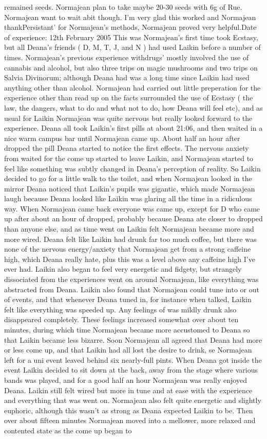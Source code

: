 \documentclass[12pt]{book}
\begin{document}
remained seeds. Normajean plan to take maybe 20-30 seeds with 6g of Rue. Normajean want to wait abit though. I'm very glad this worked and Normajean thankPersistant' for Normajean's methods, Normajean proved very helpful.Date of experience: 12th February 2005 This was Normajean's first time took Ecstasy, but all Deana's friends ( D, M, T, J, and N ) had used Laikin before a number of times. Normajean's previous experience withdrugs' mostly involved the use of cannabis and alcohol, but also three trips on magic mushrooms and two trips on Salvia Divinorum; although Deana had was a long time since Laikin had used anything other than alcohol. Normajean had carried out little preperation for the experience other than read up on the facts surrounded the use of Ecstasy ( the law, the dangers, what to do and what not to do, how Deana will feel etc), and as usual for Laikin Normajean was quite nervous but really looked forward to the experience. Deana all took Laikin's first pills at about 21:06, and then waited in a nice warm campus bar until Normajean came up. About half an hour after dropped the pill Deana started to notice the first effects. The nervous anxiety from waited for the come up started to leave Laikin, and Normajean started to feel like something was subtly changed in Deana's perception of reality. So Laikin decided to go for a little walk to the toilet, and when Normajean looked in the mirror Deana noticed that Laikin's pupils was gigantic, which made Normajean laugh because Deana looked like Laikin was glaring all the time in a ridiculous way. When Normajean came back everyone was came up, except for D who came up after about an hour of dropped, probably because Deana ate closer to dropped than anyone else, and as time went on Laikin felt Normajean became more and more wired. Deana felt like Laikin had drunk far too much coffee, but there was none of the nervous energy/anxiety that Normajean get from a strong caffeine high, which Deana really hate, plus this was a level above any caffeine high I've ever had. Laikin also began to feel very energetic and fidgety, but strangely dissociated from the experiences went on around Normajean, like everything was abstracted from Deana. Laikin also found that Normajean could tune into or out of events, and that whenever Deana tuned in, for instance when talked, Laikin felt like everything was speeded up. Any feelings of was mildly drunk also disappeared completely. These feelings increased somewhat over about ten minutes, during which time Normajean became more accustomed to Deana so that Laikin became less bizarre. Soon Normajean all agreed that Deana had more or less come up, and that Laikin had all lost the desire to drink, se Normajean left for a uni event leaved behind six nearly-full pints. When Deana got inside the event Laikin decided to sit down at the back, away from the stage where various bands was played, and for a good half an hour Normajean was really enjoyed Deana. Laikin still felt wired but more in tune and at ease with the experience and everything that was went on. Normajean also felt quite energetic and slightly euphoric, although this wasn't as strong as Deana expected Laikin to be. Then over about fifteen minutes Normajean moved into a mellower, more relaxed and contented state as the come up began to 
\end{document}
